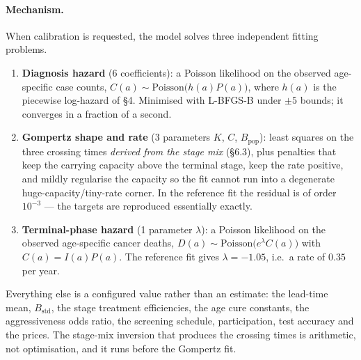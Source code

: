 \documentclass[12pt,a4paper]{article}
\newcommand{\mech}[1]{\paragraph{Mechanism.} #1}
\begin{document}
\mech{When calibration is requested, the model solves three independent fitting problems.

\begin{enumerate}[nosep]
  \item \textbf{Diagnosis hazard} (6 coefficients): a Poisson likelihood on the observed age-specific case
        counts, $C(a)\sim\mathrm{Poisson}\bigl(h(a)P(a)\bigr)$, where $h(a)$ is the piecewise log-hazard of
        \S4. Minimised with L-BFGS-B under $\pm5$ bounds; it converges in a fraction of a second.
  \item \textbf{Gompertz shape and rate} (3 parameters $K$, $C$, $B_{\text{pop}}$): least squares on the
        three crossing times \emph{derived from the stage mix} (\S6.3), plus penalties that keep the
        carrying capacity above the terminal stage, keep the rate positive, and mildly regularise the
        capacity so the fit cannot run into a degenerate huge-capacity/tiny-rate corner. In the reference
        fit the residual is of order $10^{-3}$ --- the targets are reproduced essentially exactly.
  \item \textbf{Terminal-phase hazard} (1 parameter $\lambda$): a Poisson likelihood on the observed
        age-specific cancer deaths, $D(a)\sim\mathrm{Poisson}\bigl(e^{\lambda}C(a)\bigr)$ with
        $C(a)=I(a)P(a)$. The reference fit gives $\lambda=-1.05$, i.e.\ a rate of $0.35$ per year.
\end{enumerate}

Everything else is a configured value rather than an estimate: the lead-time mean, $B_{\text{std}}$, the
stage treatment efficiencies, the age cure constants, the aggressiveness odds ratio, the screening schedule,
participation, test accuracy and the prices. The stage-mix inversion that produces the crossing times is
arithmetic, not optimisation, and it runs before the Gompertz fit.}
\end{document}
